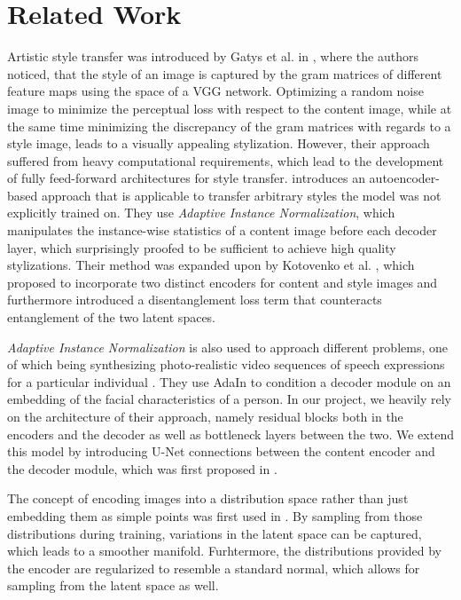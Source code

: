 \documentclass[10pt,twocolumn,letterpaper]{article}
\begin{document}
\section{Related Work}

Artistic style transfer was introduced by Gatys et al. in \cite{gatys}, where the authors noticed, that the style of an image is captured by the gram matrices of different feature maps using the space of a VGG network.   Optimizing a random noise image to minimize the perceptual loss with respect to the content image, while at the same time minimizing the discrepancy of the gram matrices with regards to a style image, leads to a visually appealing stylization. However, their approach suffered from heavy computational requirements, which lead to the development of fully feed-forward architectures for style transfer. \cite{adain} introduces an autoencoder-based approach that is applicable to transfer arbitrary styles the model was not explicitly trained on. They use \textit{Adaptive Instance Normalization}, which manipulates the instance-wise statistics of a content image before each decoder layer, which surprisingly proofed to be sufficient to achieve high quality stylizations. Their method was expanded upon by Kotovenko et al. \cite{disentanglement}, which proposed to incorporate two distinct encoders for content and style images and furthermore introduced a disentanglement loss term that counteracts entanglement of the two latent spaces.

\textit{Adaptive Instance Normalization} is also used to approach different problems, one of which being synthesizing photo-realistic video sequences of speech expressions for a particular individual \cite{talkingheads}. They use AdaIn to condition a decoder module on an embedding of the facial characteristics of a person. In our project, we heavily rely on the architecture of their approach, namely residual blocks both in the encoders and the decoder as well as bottleneck layers between the two. We extend this model by introducing U-Net connections between the content encoder and the decoder module, which was first proposed in \cite{unet}.

The concept of encoding images into a distribution space rather than just embedding them as simple points was first used in \cite{vae}. By sampling from those distributions during training, variations in the latent space can be captured, which leads to a smoother manifold. Furhtermore, the distributions provided by the encoder are regularized to resemble a standard normal, which allows for sampling from the latent space as well.
\end{document}
